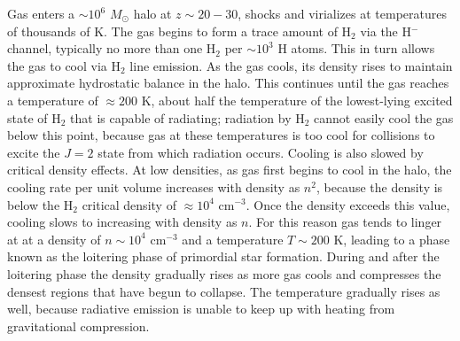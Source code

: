 Gas enters a $\sim 10^6$ $M_\odot$ halo at $z\sim 20-30$, shocks and virializes at temperatures of thousands of K. The gas begins to form a trace amount of H$_2$ via the H$^{-}$ channel, typically no more than one H$_2$ per $\sim 10^3$ H atoms. This in turn allows the gas to cool via H$_2$ line emission. As the gas cools, its density rises to maintain approximate hydrostatic balance in the halo. This continues until the gas reaches a temperature of $\approx 200$ K, about half the temperature of the lowest-lying excited state of H$_2$ that is capable of radiating; radiation by H$_2$ cannot easily cool the gas below this point, because gas at these temperatures is too cool for collisions to excite the $J=2$ state from which radiation occurs. Cooling is also slowed by critical density effects. At low densities, as gas first begins to cool in the halo, the cooling rate per unit volume increases with density as $n^2$, because the density is below the H$_2$ critical density of $\approx 10^4$ cm$^{-3}$. Once the density exceeds this value, cooling slows to increasing with density as $n$. For this reason gas tends to linger at at a density of $n\sim 10^4$ cm$^{-3}$ and a temperature $T\sim 200$ K, leading to a phase known as the loitering phase of primordial star formation. During and after the loitering phase the density gradually rises as more gas cools and compresses the densest regions that have begun to collapse. The temperature gradually rises as well, because radiative emission is unable to keep up with heating from gravitational compression.

